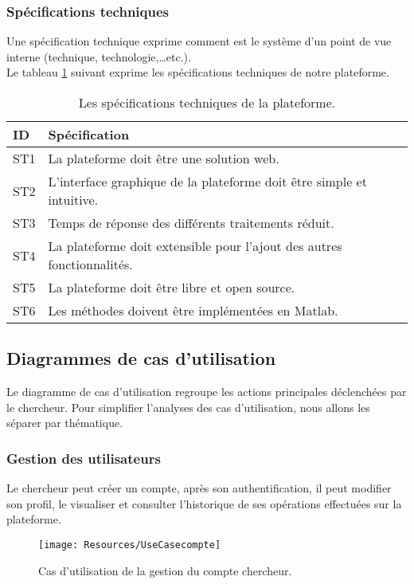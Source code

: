 \subsubsection{Spécifications techniques}
Une spécification technique exprime comment est le
système d’un point de vue interne (technique,
technologie,…etc.).
\\ Le tableau \ref{specifnonFonct} suivant exprime les spécifications techniques de notre plateforme. 
\begin{table}[H]
	\centering
	
	\label{specifnonFonct}
	\begin{tabular}{|l | p{14.5cm}| }
		\hline	ID  & Spécification           \\\hline                                                                                        
		ST1	&La plateforme doit être une solution web. \\ \hline
		ST2	&L’interface graphique de la plateforme doit être simple et intuitive.  \\ \hline
		ST3	&Temps de réponse des différents traitements réduit.  \\ \hline
		ST4	&La plateforme doit extensible pour l'ajout des autres fonctionnalités.   \\ \hline
		ST5	&La plateforme doit être libre et open source.   \\ \hline
		ST6	&Les méthodes doivent être implémentées en Matlab.   \\ \hline
	\end{tabular}
\caption{Les spécifications techniques de la plateforme.}
\end{table}
\subsection{Diagrammes de cas d'utilisation } 
Le diagramme de cas d’utilisation regroupe les actions principales déclenchées par le chercheur.  Pour simplifier l’analyses des cas d’utilisation, nous allons les séparer par thématique.
\subsubsection{Gestion des utilisateurs }
Le chercheur peut créer un compte, après son authentification, il peut modifier son profil, le visualiser et consulter l’historique de ses opérations effectuées sur la plateforme.
\begin{figure}[H]
	\centering
	\texttt{[image: Resources/UseCasecompte]}
	
	\caption{Cas d'utilisation de la gestion du compte chercheur.}
	\label{usecasecompte}
\end{figure}
